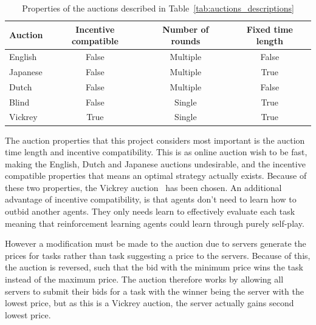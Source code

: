 \begin{table}[h]
    \centering
    \begin{tabular}{|l|c|c|c|} \hline
        \textbf{Auction}  & \textbf{Incentive compatible} & \textbf{Number of rounds} & \textbf{Fixed time length} \\ \hline
        English           & False                         & Multiple                  & False            \\ \hline
        Japanese          & False                         & Multiple                  & True             \\ \hline
        Dutch             & False                         & Multiple                  & False            \\ \hline
        Blind             & False                         & Single                    & True             \\ \hline
        Vickrey           & True                          & Single                    & True             \\ \hline
    \end{tabular}
    \caption{Properties of the auctions described in Table~\ref{tab:auctions_descriptions}}
    \label{tab:auction_properties}
\end{table}

The auction properties that this project considers most important is the auction time length and incentive compatibility.
This is as online auction wish to be fast, making the English, Dutch and Japanese auctions undesirable, and
the incentive compatible properties that means an optimal strategy actually exists. Because of these two
properties, the Vickrey auction~\citep{vickrey} has been chosen. An additional advantage of incentive compatibility,
is that agents don't need to learn how to outbid another agents. They only needs learn to effectively evaluate each task
meaning that reinforcement learning agents could learn through purely self-play.

However a modification must be made to the auction due to servers generate the prices for tasks rather than task
suggesting a price to the servers. Because of this, the auction is reversed, such that the bid with the minimum price
wins the task instead of the maximum price. The auction therefore works by allowing all servers to submit their bids for
a task with the winner being the server with the lowest price, but as this is a Vickrey auction, the server actually
gains second lowest price.

